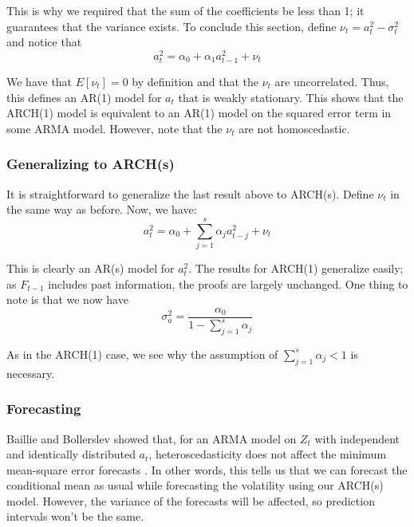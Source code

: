 \documentclass[12pt]{article}
\begin{document}
    This is why we required that the sum of the coefficients be less than 1; it guarantees that the variance exists. To conclude this section, define $\nu_t = a^2_t - \sigma^2_t$ and notice that 
    \begin{equation}
        a^2_t = \alpha_0 + \alpha_1a^2_{t-1} + \nu_t
    \end{equation}
    
    We have that $E[\nu_t] = 0$ by definition and  that the $\nu_t$ are uncorrelated. Thus, this defines an AR(1) model for $a_t$ that is weakly stationary. This shows that the ARCH(1) model is equivalent to an AR(1) model on the squared error term in some ARMA model. However, note that the $\nu_t$ are not homoscedastic. 



\subsubsection{Generalizing to ARCH(s)}

It is straightforward to generalize the last result above to ARCH(s). Define $\nu_t$ in the same way as before. Now, we have: 
    \begin{equation}
        a^2_t = \alpha_0 + \sum_{j=1}^{s} \alpha_ja^2_{t-j} + \nu_t
    \end{equation}

This is clearly an AR(s) model for $a^2_t$. The results for ARCH(1) generalize easily; as $F_{t-1}$ includes past information, the proofs are largely unchanged. One thing to note is that we now have 
    \begin{equation}
        \sigma^2_a = \frac{\alpha_0}{1-\sum_{j=1}^{s} \alpha_j}
    \end{equation}

As in the ARCH(1) case, we see why the assumption of $\sum_{j=1}^{s} \alpha_j < 1$ is necessary. 

\subsubsection{Forecasting}

Baillie and Bollerslev showed that, for an ARMA model on $Z_t$ with independent and identically distributed $a_t$, heteroscedasticity does not affect the minimum mean-square error forecasts \cite{baillie}. In other words, this tells us that we can forecast the conditional mean as usual while forecasting the volatility using our ARCH(s) model. However, the variance of the forecasts will be affected, so prediction intervals won't be the same.
\end{document}
